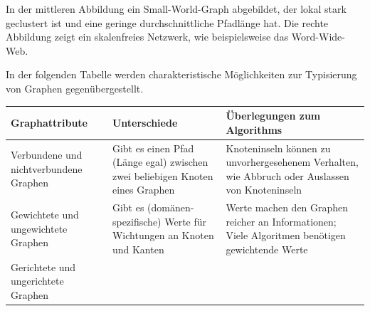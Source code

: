 \documentclass[ngerman,]{scrreprt}
\begin{document}
In der mittleren Abbildung ein Small-World-Graph abgebildet, der lokal stark geclustert ist und eine geringe durchschnittliche Pfadlänge hat. Die rechte Abbildung zeigt ein skalenfreies Netzwerk, wie beispielsweise das Word-Wide-Web.

In der folgenden Tabelle werden charakteristische Möglichkeiten zur Typisierung von Graphen gegenübergestellt.

\begin{longtable}[]{@{}lll@{}}
\toprule
\begin{minipage}[b]{0.22\columnwidth}\raggedright
Graphattribute\strut
\end{minipage} & \begin{minipage}[b]{0.26\columnwidth}\raggedright
Unterschiede\strut
\end{minipage} & \begin{minipage}[b]{0.44\columnwidth}\raggedright
Überlegungen zum Algorithms\strut
\end{minipage}\tabularnewline
\midrule
\endhead
\begin{minipage}[t]{0.22\columnwidth}\raggedright
Verbundene und nichtverbundene Graphen\strut
\end{minipage} & \begin{minipage}[t]{0.26\columnwidth}\raggedright
Gibt es einen Pfad (Länge egal) zwischen zwei beliebigen Knoten eines Graphen\strut
\end{minipage} & \begin{minipage}[t]{0.44\columnwidth}\raggedright
Knoteninseln können zu unvorhergesehenem Verhalten, wie Abbruch oder Auslassen von Knoteninseln\strut
\end{minipage}\tabularnewline
\begin{minipage}[t]{0.22\columnwidth}\raggedright
Gewichtete und ungewichtete Graphen\strut
\end{minipage} & \begin{minipage}[t]{0.26\columnwidth}\raggedright
Gibt es (domänen-spezifische) Werte für Wichtungen an Knoten und Kanten\strut
\end{minipage} & \begin{minipage}[t]{0.44\columnwidth}\raggedright
Werte machen den Graphen reicher an Informationen; Viele Algoritmen benötigen gewichtende Werte\strut
\end{minipage}\tabularnewline
\begin{minipage}[t]{0.22\columnwidth}\raggedright
Gerichtete und ungerichtete Graphen\strut
\end{minipage} & \begin{minipage}[t]{0.26\columnwidth}\raggedright

\end{minipage}
\end{longtable}
\end{document}
